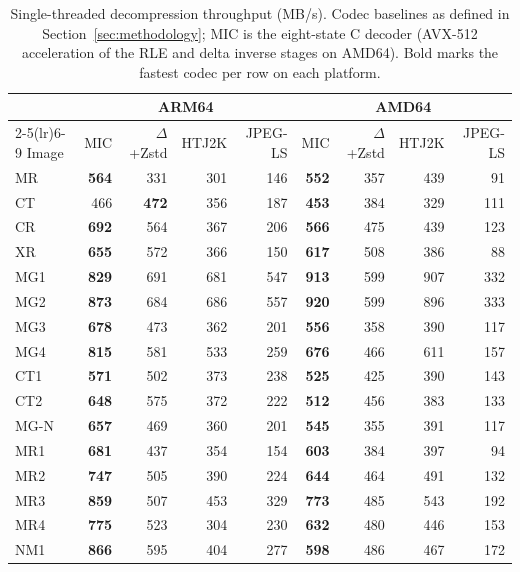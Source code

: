 \documentclass[journal]{IEEEtran}
\begin{document}
\begin{table}[htbp]
\centering
\caption{Single-threaded decompression throughput (MB/s).
Codec baselines as defined in Section~\ref{sec:methodology}; MIC is
the eight-state C decoder (AVX-512 acceleration of the RLE and delta
inverse stages on AMD64). Bold marks the fastest codec per row on
each platform.}
\label{tab:decomp}
\scriptsize
\begin{tabular}{l|rrrr|rrrr}
\toprule
 & \multicolumn{4}{c|}{ARM64} & \multicolumn{4}{c}{AMD64} \\
\cmidrule(lr){2-5}\cmidrule(lr){6-9}
Image & MIC & $\Delta$+Zstd & HTJ2K & JPEG-LS & MIC & $\Delta$+Zstd & HTJ2K & JPEG-LS \\
\midrule
MR   & \textbf{564} & 331          & 301 & 146 & \textbf{552} & 357 & 439 &  91 \\
CT   & 466          & \textbf{472} & 356 & 187 & \textbf{453} & 384 & 329 & 111 \\
CR   & \textbf{692} & 564          & 367 & 206 & \textbf{566} & 475 & 439 & 123 \\
XR   & \textbf{655} & 572          & 366 & 150 & \textbf{617} & 508 & 386 &  88 \\
MG1  & \textbf{829} & 691          & 681 & 547 & \textbf{913} & 599 & 907 & 332 \\
MG2  & \textbf{873} & 684          & 686 & 557 & \textbf{920} & 599 & 896 & 333 \\
MG3  & \textbf{678} & 473          & 362 & 201 & \textbf{556} & 358 & 390 & 117 \\
MG4  & \textbf{815} & 581          & 533 & 259 & \textbf{676} & 466 & 611 & 157 \\
CT1  & \textbf{571} & 502          & 373 & 238 & \textbf{525} & 425 & 390 & 143 \\
CT2  & \textbf{648} & 575          & 372 & 222 & \textbf{512} & 456 & 383 & 133 \\
MG-N & \textbf{657} & 469          & 360 & 201 & \textbf{545} & 355 & 391 & 117 \\
MR1  & \textbf{681} & 437          & 354 & 154 & \textbf{603} & 384 & 397 &  94 \\
MR2  & \textbf{747} & 505          & 390 & 224 & \textbf{644} & 464 & 491 & 132 \\
MR3  & \textbf{859} & 507          & 453 & 329 & \textbf{773} & 485 & 543 & 192 \\
MR4  & \textbf{775} & 523          & 304 & 230 & \textbf{632} & 480 & 446 & 153 \\
NM1  & \textbf{866} & 595          & 404 & 277 & \textbf{598} & 486 & 467 & 172 \\

\end{tabular}
\end{table}
\end{document}
